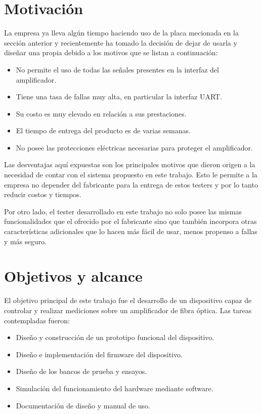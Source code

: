 \section{Motivación}

La empresa ya lleva algún tiempo haciendo uso de la placa mecionada en la sección anterior y recientemente ha tomado la decisión de dejar de usarla y diseñar una propia debido a los motivos que se listan a continuación:

\begin{itemize}
\item No permite el uso de todas las señales presentes en la interfaz del amplificador.
\item Tiene una tasa de fallas muy alta, en particular la interfaz UART.
\item Su costo es muy elevado en relación a sus prestaciones.
\item El tiempo de entrega del producto es de varias semanas.
\item No posee las protecciones eléctricas necesarias para proteger el amplificador.
\end{itemize}

Las desventajas aquí expuestas son los principales motivos que dieron origen a la necesidad de contar con el sistema propuesto en este trabajo. Esto le permite a la empresa no depender del fabricante para la entrega de estos testers y por lo tanto reducir costos y tiempos.

Por otro lado, el tester desarrollado en este trabajo no solo posee las mismas funcionalidades que el ofrecido por el fabricante sino que también incorpora otras características adicionales que lo hacen más fácil de usar, menos propenso a fallas y más seguro.


\section{Objetivos y alcance}

El objetivo principal de este trabajo fue el desarrollo de un dispositivo capaz de controlar y realizar mediciones sobre un amplificador de fibra óptica. Las tareas contempladas fueron:

\begin{itemize}
\item Diseño y construcción de un prototipo funcional del dispositivo.
\item Diseño e implementación del firmware del dispositivo.
\item Diseño de los bancos de prueba y ensayos.
\item Simulación del funcionamiento del hardware mediante software.
\item Documentación de diseño y manual de uso.
\end{itemize}


